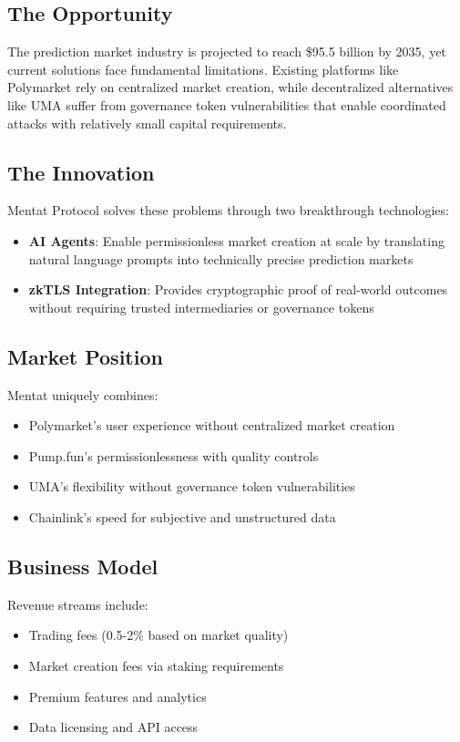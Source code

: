 \documentclass[11pt,a4paper]{article}
\begin{document}
\subsection{The Opportunity}
The prediction market industry is projected to reach \$95.5 billion by 2035, yet current solutions face fundamental limitations. Existing platforms like Polymarket rely on centralized market creation, while decentralized alternatives like UMA suffer from governance token vulnerabilities that enable coordinated attacks with relatively small capital requirements.

\subsection{The Innovation}
Mentat Protocol solves these problems through two breakthrough technologies:
\begin{itemize}
    \item \textbf{AI Agents}: Enable permissionless market creation at scale by translating natural language prompts into technically precise prediction markets
    \item \textbf{zkTLS Integration}: Provides cryptographic proof of real-world outcomes without requiring trusted intermediaries or governance tokens
\end{itemize}

\subsection{Market Position}
Mentat uniquely combines:
\begin{itemize}
    \item Polymarket's user experience without centralized market creation
    \item Pump.fun's permissionlessness with quality controls
    \item UMA's flexibility without governance token vulnerabilities
    \item Chainlink's speed for subjective and unstructured data
\end{itemize}

\subsection{Business Model}
Revenue streams include:
\begin{itemize}
    \item Trading fees (0.5-2\% based on market quality)
    \item Market creation fees via staking requirements
    \item Premium features and analytics
    \item Data licensing and API access
\end{itemize}
\end{document}
